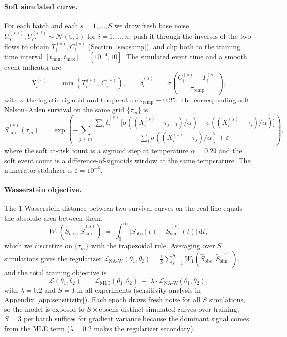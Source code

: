 \paragraph{Soft simulated curve.}
For each batch and each $s = 1, \dots, S$ we draw fresh base noise
$U_T^{(s, i)}, U_C^{(s, i)} \sim \mathcal{N}(0, 1)$ for $i = 1, \dots, n$,
push it through the inverses of the two flows to obtain
$T_i^{(s)}, C_i^{(s)}$ (Section~\ref{sec:samp}), and clip both to the
training time interval $[t_{\min}, t_{\max}] = [10^{-4}, 10]$. The simulated
event time and a smooth event indicator are
\[
    X_i^{(s)} \;=\; \min\!\left(T_i^{(s)},\, C_i^{(s)}\right),
    \qquad
    \widetilde{\delta}_i^{(s)}
    \;=\;
    \sigma\!\left(\frac{C_i^{(s)} - T_i^{(s)}}{\tau_{\text{temp}}}\right),
\]
with $\sigma$ the logistic sigmoid and temperature
$\tau_{\text{temp}} = 0.25$. The corresponding soft Nelson--Aalen survival on
the same grid $\{\tau_m\}$ is
\[
    \widetilde{S}_{\text{sim}}^{(s)}(\tau_m)
    \;=\;
    \exp\!\left(
        -\sum_{j \le m}
        \frac{
            \sum_i \widetilde{\delta}_i^{(s)} \,
            \big[
                \sigma\!\left((X_i^{(s)} - \tau_{j-1}) / \alpha\right)
                - \sigma\!\left((X_i^{(s)} - \tau_j) / \alpha\right)
            \big]
        }{
            \sum_i \sigma\!\left((X_i^{(s)} - \tau_j) / \alpha\right)
            + \varepsilon
        }
    \right),
\]
where the soft at-risk count is a sigmoid step at temperature $\alpha = 0.20$
and the soft event count is a difference-of-sigmoids window at the same
temperature. The numerator stabilizer is $\varepsilon = 10^{-6}$.

\paragraph{Wasserstein objective.}
The $1$-Wasserstein distance between two survival curves on the real line
equals the absolute area between them,
\[
    W_1\!\left(\widehat{S}_{\text{obs}},\, \widetilde{S}_{\text{sim}}^{(s)}\right)
    \;=\;
    \int_{0}^{\infty}
        \big|
            \widehat{S}_{\text{obs}}(t) - \widetilde{S}_{\text{sim}}^{(s)}(t)
        \big|\,
    \mathrm{d}t,
\]
which we discretize on $\{\tau_m\}$ with the trapezoidal rule. Averaging over
$S$ simulations gives the regularizer
\(
    \mathcal{L}_{\text{NA-W}}(\theta_1, \theta_2)
    =
    \frac{1}{S} \sum_{s=1}^{S}
        W_1\!\left(\widehat{S}_{\text{obs}},\, \widetilde{S}_{\text{sim}}^{(s)}\right),
\)
and the total training objective is
\begin{equation}
    \mathcal{L}(\theta_1, \theta_2)
    \;=\;
    \mathcal{L}_{\text{MLE}}(\theta_1, \theta_2)
    \;+\;
    \lambda \cdot \mathcal{L}_{\text{NA-W}}(\theta_1, \theta_2),
    \label{eq:total}
\end{equation}
with $\lambda = 0.2$ and $S = 3$ in all experiments (sensitivity
analysis in Appendix~\ref{app:sensitivity}). Each epoch draws fresh noise
for all $S$ simulations, so the model is exposed to
$S \times \text{epochs}$ distinct simulated curves over training; $S = 3$
per batch suffices for gradient variance because the dominant signal comes
from the MLE term ($\lambda = 0.2$ makes the regularizer secondary).

